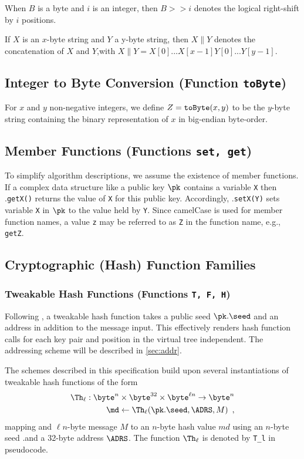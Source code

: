 When $B$ is a byte and $i$ is an integer, then $B >> i$ denotes the logical right-shift by $i$ positions.

If $X$ is an $x$-byte string and $Y$ a y-byte string, then $X \| Y$ denotes the concatenation of $X$ and $Y$,with $X\|Y = X[0]...X[x-1] Y[0]...Y[y-1]$.

\subsection{Integer to Byte Conversion (Function \texttt{toByte})}

For $x$ and $y$ non-negative integers, we define $Z = {\tt toByte}(x,y) $ to be the $y$-byte string containing the binary representation of $x$ in big-endian byte-order.

\subsection{Member Functions (Functions \texttt{set, get})}

To simplify algorithm descriptions, we assume the existence of member functions. If a complex data structure like a public key $\pk$ contains a variable \texttt{X} then \pk.\texttt{getX()} returns the value of \texttt{X} for this public key. Accordingly, \pk.\texttt{setX(Y)} sets variable \texttt{X} in $\pk$ to the value held by \texttt{Y}. Since camelCase is used for member function names, a value \texttt{z} may be referred to as \texttt{Z} in the function name, e.g., \texttt{getZ}.

\subsection{Cryptographic (Hash) Function Families} 

\subsubsection{Tweakable Hash Functions (Functions \texttt{T, F, H})}

Following \SPHINCSP, a tweakable hash function takes a public seed $\pk.\seed$ and an address \ADRS in addition to the message input. This effectively renders hash function calls for each key pair and position in the virtual tree independent. The addressing scheme will be described in \cref{sec:addr}.
 

The schemes described in this specification build upon several instantiations of tweakable hash functions of the form
\begin{align*}
    \Th_\ell : \byte^n \times \byte^{32} \times \byte^{\ell n} \to \byte^n \\
    \md \gets \Th_\ell (\pk.\seed, \ADRS, M) \enspace,
\end{align*}
mapping and $\ell n$-byte message $M$ to an $n$-byte hash value $md$ using an $n$-byte seed \pk.\seed and a 32-byte address $\ADRS$. The function $\Th_\ell$ is denoted by \texttt{T\_l} in pseudocode.

